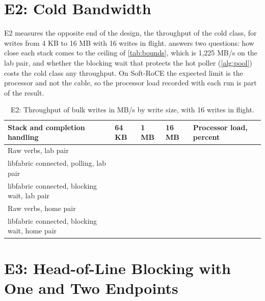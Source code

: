 \section{E2: Cold Bandwidth}
\label{sec:res-e2}

E2 measures the opposite end of the design, the throughput of the cold class,
for writes from 4 KB to 16 MB with 16 writes in flight.  answers
two questions: how close each stack comes to the ceiling of
\cref{tab:bounds}, which is 1,225 MB/s on the lab pair, and whether the
blocking wait that protects the hot poller (\cref{alg:pool}) costs the cold
class any throughput. On Soft-RoCE the expected limit is the processor and
not the cable, so the processor load recorded with each run is part of the
result.

\begin{table}[htbp]
  \centering
  \caption[E2: Throughput of bulk writes by stack]{E2: Throughput of bulk writes in MB/s by write size, with 16 writes in flight.}
  \label{tab:e2}
  \small
  \begin{tabular}{L{6.2cm}L{1.6cm}L{1.6cm}L{1.6cm}L{2.2cm}}
    \toprule
    Stack and completion handling & 64 KB & 1 MB & 16 MB & Processor load, percent \\
    \midrule
    Raw verbs, lab pair & & & & \\
    libfabric connected, polling, lab pair & & & & \\
    libfabric connected, blocking wait, lab pair & & & & \\
    Raw verbs, home pair & & & & \\
    libfabric connected, blocking wait, home pair & & & & \\
    \bottomrule
  \end{tabular}
  \par\smallskip{}
\end{table}


\section{E3: Head-of-Line Blocking with One and Two Endpoints}
\label{sec:res-e3}

